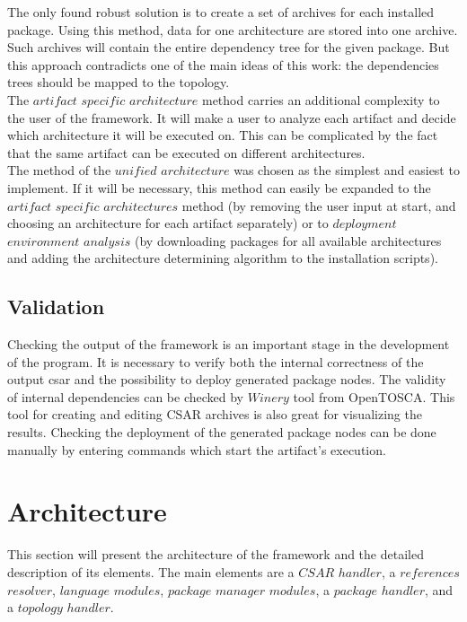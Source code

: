 The only found robust solution is to create a set of archives for each installed package. Using this method, data for one architecture are stored into one archive.
Such archives will contain the entire dependency tree for the given package.
But this approach contradicts one of the main ideas of this work: the dependencies trees should be mapped to the topology.\\
The $artifact$ $specific$ $architecture$ method carries an additional complexity to the user of the framework.
It will make a user to analyze each artifact and decide which architecture it will be executed on. 
This can be complicated by the fact that the same artifact can be executed on different architectures.\\
The method of the $unified$ $architecture$ was chosen as the simplest and easiest to implement.
If it will be necessary, this method can easily be expanded to the $artifact$ $specific$ $architectures$ method (by removing the user input at start, and choosing an architecture for each artifact separately) or to $deployment$ $environment$ $analysis$ (by downloading packages for all available architectures and adding the architecture determining algorithm to the installation scripts).

%

\subsection{Validation}
Checking the output of the framework is an important stage in the development of the program.
It is necessary to verify both the internal correctness of the output \gls{csar} and the possibility to deploy generated package nodes.
The validity of internal dependencies can be checked by $Winery$ tool from OpenTOSCA.
This tool for creating and editing CSAR archives is also great for visualizing the results.
Checking the deployment of the generated package nodes can be done manually by entering commands which start the  artifact's execution.

\section{Architecture}\label{sec:arch}
This section will present the architecture of the framework and the detailed description of its elements.
The main elements are a \boldmath $CSAR$ $handler$, a $references$ $resolver$, $language$ $modules$, $package$ $manager$ $modules$, a $package$ $handler$, and a $topology$ $handler$. \unboldmath

